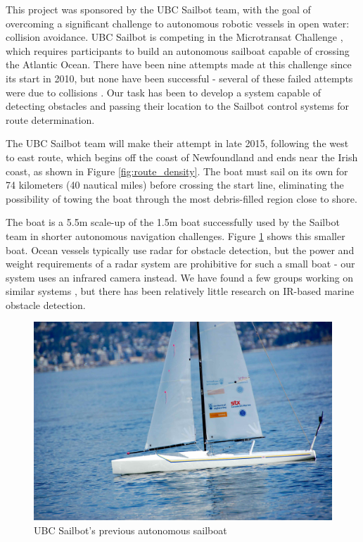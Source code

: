 This project was sponsored by the UBC Sailbot team, with the goal of overcoming a significant challenge to autonomous robotic vessels in open water: collision avoidance. UBC Sailbot is competing in the Microtransat Challenge \cite{transat-history}, which requires participants to build an autonomous sailboat capable of crossing the Atlantic Ocean.  There have been nine attempts made at this challenge since its start in 2010, but none have been successful - several of these failed attempts were due to collisions \cite{transat-history}.  Our task has been to develop a system capable of detecting obstacles and passing their location to the Sailbot control systems for route determination.

The UBC Sailbot team will make their attempt in late 2015, following the west to east route, which begins off the coast of Newfoundland and ends near the Irish coast, as shown in Figure \ref{fig:route_density}. The boat must sail on its own for 74 kilometers (40 nautical miles) before crossing the start line, eliminating the possibility of towing the boat through the most debris-filled region close to shore.

The boat is a 5.5m scale-up of the 1.5m boat successfully used by the Sailbot team in shorter autonomous navigation challenges. Figure \ref{fig:sailbot} shows this smaller boat.  Ocean vessels typically use radar for obstacle detection, but the power and weight requirements of a radar system are prohibitive for such a small boat - our system uses an infrared camera instead. We have found a few groups working on similar systems \cite{ODU-boat-IR-detection}, but there has been relatively little research on IR-based marine obstacle detection.

\begin{figure}
\includegraphics[width=120mm,natwidth=1203,natheight=627]{"./image/sailbot"}
\caption[UBC Sailbot.]{\label{fig:sailbot}UBC Sailbot's previous autonomous sailboat \cite{ubc-sailbot__image}}
\end{figure}


